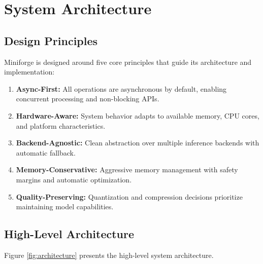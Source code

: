 \section{System Architecture}
\label{sec:architecture}

\subsection{Design Principles}

Miniforge is designed around five core principles that guide its architecture and implementation:

\begin{enumerate}
    \item \textbf{Async-First:} All operations are asynchronous by default, enabling concurrent processing and non-blocking APIs.
    \item \textbf{Hardware-Aware:} System behavior adapts to available memory, CPU cores, and platform characteristics.
    \item \textbf{Backend-Agnostic:} Clean abstraction over multiple inference backends with automatic fallback.
    \item \textbf{Memory-Conservative:} Aggressive memory management with safety margins and automatic optimization.
    \item \textbf{Quality-Preserving:} Quantization and compression decisions prioritize maintaining model capabilities.
\end{enumerate}

\subsection{High-Level Architecture}

Figure \ref{fig:architecture} presents the high-level system architecture.

